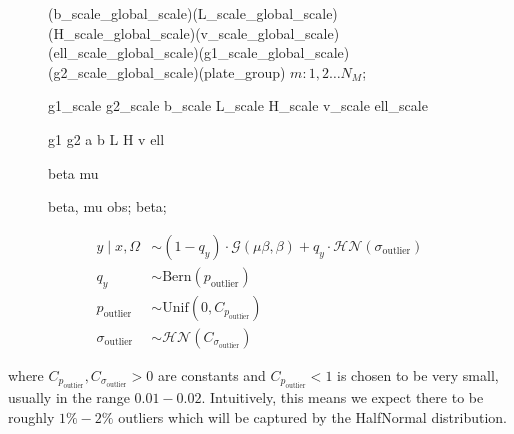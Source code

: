 \documentclass[a4paper,12pt]{article}
\begin{document}
\begin{figure}[H]
{        %
         {(b_scale_global_scale)(L_scale_global_scale)(H_scale_global_scale)(v_scale_global_scale)(ell_scale_global_scale)(g1_scale_global_scale)(g2_scale_global_scale)(plate_group)} {$m: 1, 2 \ldots N_M$};

         {g1_scale}
         {g2_scale}
         {b_scale}
         {L_scale}
         {H_scale}
         {v_scale}
         {ell_scale}

         {g1}
         {g2}
         {a}
         {b}
         {L}
         {H}
         {v}
         {ell}

         {beta}
         {mu}

         {beta, mu}
         {obs};
         {beta};
    }
\end{figure}

\pagebreak
\begin{align*}
    y \mid x, \Omega &\sim \left(1 - q_y\right)\cdot\mathcal{G}\left(\mu\beta, \beta\right) + q_y \cdot \mathcal{HN}\left(\sigma_{\text{outlier}}\right) \tag{4.3.7} \\
    q_y &\sim \mathrm{Bern}\left(p_{\text{outlier}}\right) \tag{4.3.8} \\
    p_{\text{outlier}} &\sim \mathrm{Unif}\left(0, C_{p_{\text{outlier}}}\right) \tag{4.3.9} \\
    \sigma_{\text{outlier}} &\sim \mathcal{HN}\left(C_{\sigma_{\text{outlier}}}\right) \tag{4.3.10}
\end{align*}

where $C_{p_{\text{outlier}}}, C_{\sigma_{\text{outlier}}} > 0$ are constants and $C_{p_{\text{outlier}}} < 1$ is chosen to be very small, usually in the range $0.01 - 0.02$. Intuitively, this means we expect there to be roughly $1\% - 2\%$ outliers which will be captured by the HalfNormal distribution.
\end{document}
